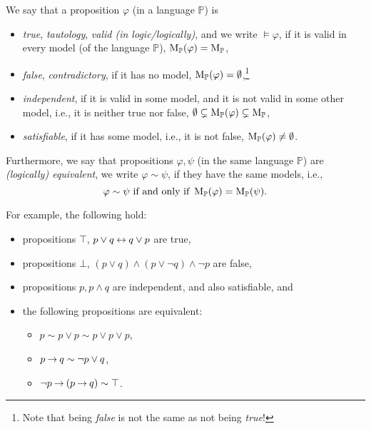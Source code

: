 \begin{definition}\label{definition:semantic-notions}
We say that a proposition $\varphi$ (in a language $\mathbb{P}$) is
\begin{itemize}
    \item \emph{true}, \emph{tautology}, \emph{valid (in logic/logically)}, and we write $\models \varphi$, if it is valid in every model (of the language $\mathbb{P}$), $\operatorname{M}_\mathbb{P}(\varphi) = \operatorname{M}_\mathbb{P}$,
    \item \emph{false}, \emph{contradictory}, if it has no model, $\operatorname{M}_\mathbb{P}(\varphi) = \emptyset$,\footnote{Note that being \emph{false} is not the same as not being \emph{true}!}
    \item \emph{independent}, if it is valid in some model, and it is not valid in some other model, i.e., it is neither true nor false, $\emptyset \subsetneq \operatorname{M}_\mathbb{P}(\varphi) \subsetneq \operatorname{M}_\mathbb{P}$,
    \item \emph{satisfiable}, if it has some model, i.e., it is not false, $\operatorname{M}_\mathbb{P}(\varphi) \neq \emptyset$.
\end{itemize}
Furthermore, we say that propositions $\varphi, \psi$ (in the same language $\mathbb{P}$) are \emph{(logically) equivalent}, we write $\varphi \sim \psi$, if they have the same models, i.e.,
$$
\varphi \sim \psi \text{ if and only if } \operatorname{M}_\mathbb{P}(\varphi) = \operatorname{M}_\mathbb{P}(\psi).
$$    
\end{definition}

\begin{example} For example, the following hold:
    \begin{itemize}
        \item propositions $\top$, $p \lor q \mathbin{\leftrightarrow} q \lor p$ are true,
        \item propositions $\bot$, $(p \lor q) \land (p \lor \neg q) \land \neg p$ are false,
        \item propositions $p, p \land q$ are independent, and also satisfiable, and
        \item the following propositions are equivalent: 
        \begin{itemize}
            \item $p \sim p \lor p \sim p \lor p \lor p$,
            \item $p \mathbin{\rightarrow} q \sim \neg p \lor q$,
            \item $\neg p \mathbin{\rightarrow} (p \mathbin{\rightarrow} q) \sim \top $.
        \end{itemize}  
    \end{itemize}      
\end{example}

